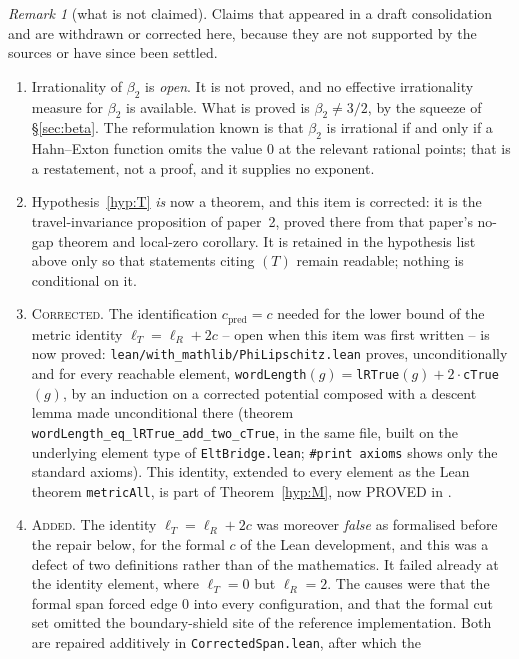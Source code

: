 \documentclass[11pt]{article}
\theoremstyle{definition}
\theoremstyle{remark}
\newtheorem{remark}[theorem]{Remark}
\theoremstyle{definition}
\begin{document}
\begin{remark}[what is not claimed]\label{rem:notclaimed}
Claims that appeared in a draft consolidation and are withdrawn or corrected here, because
they are not supported by the sources or have since been settled.
\begin{enumerate}[label=(\roman*),leftmargin=2.2em]
\item Irrationality of $\beta_2$ is \emph{open}. It is not proved, and no effective irrationality
measure for $\beta_2$ is available. What is proved is $\beta_2\ne3/2$, by the squeeze of
\S\ref{sec:beta}. The reformulation known is that $\beta_2$ is irrational if and only if a
Hahn--Exton function omits the value $0$ at the relevant rational points; that is a restatement,
not a proof, and it supplies no exponent.
\item Hypothesis~\ref{hyp:T} \emph{is} now a theorem, and this item is corrected: it is
the travel-invariance proposition of paper~2, proved there from that paper's no-gap theorem and
local-zero corollary. It is retained in the hypothesis list above only so that
statements citing $(T)$ remain readable; nothing is conditional on it.
\item \textsc{Corrected.} The identification $c_{\mathrm{pred}}=c$ needed for the lower bound of
the metric identity $\ell_T=\ell_R+2c$ -- open when this item was first written -- is now proved:
\texttt{lean/with\_mathlib/PhiLipschitz.lean} proves, unconditionally and for every reachable
element, \texttt{wordLength}$(g)=$\texttt{lRTrue}$(g)+2\cdot$\texttt{cTrue}$(g)$, by an induction
on a corrected potential composed with a descent lemma made unconditional there
(theorem \texttt{wordLength\_eq\_lRTrue\_add\_two\_cTrue}, in the same file, built on the
underlying element type of \texttt{EltBridge.lean};
\texttt{\#print axioms} shows only the standard axioms). This identity, extended to every element as the Lean theorem \texttt{metricAll}, is part of
Theorem~\ref{hyp:M}, now PROVED in \cite{paper2}.
\item \textsc{Added.} The identity $\ell_T=\ell_R+2c$ was moreover \emph{false} as formalised
before the repair below, for the formal $c$ of the Lean development, and this was a defect of
two definitions rather than of the mathematics. It failed already at the identity element, where
$\ell_T=0$ but $\ell_R=2$. The causes were that the formal span forced edge $0$ into every
configuration, and that the formal cut set omitted the boundary-shield site of the reference
implementation. Both are repaired additively in \texttt{CorrectedSpan.lean}, after which the

\end{enumerate}
\end{remark}
\end{document}
